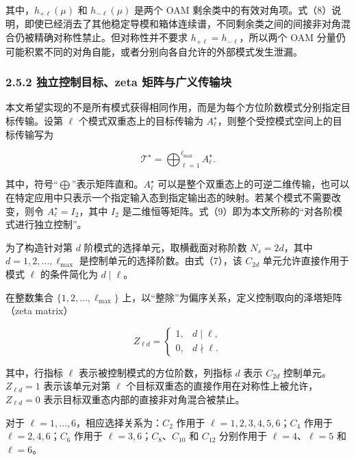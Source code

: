 \documentclass[
  UTF8,
  zihao=-4,
  fontset=fandol]{ctexart}
\begin{document}
其中，\(h_{+\ell}(\mu)\) 和 \(h_{-\ell}(\mu)\) 是两个 OAM
剩余类中的有效对角项。式（8）说明，即使已经消去了其他稳定导模和箱体连续谱，不同剩余类之间的间接非对角混合仍被精确对称性禁止。但对称性并不要求
\(h_{+\ell}=h_{-\ell}\)，所以两个 OAM
分量仍可能积累不同的对角自能，或者分别向各自允许的外部模式发生泄漏。

\hypertarget{ux72ecux7acbux63a7ux5236ux76eeux6807zeta-ux77e9ux9635ux4e0eux5e7fux4e49ux4f20ux8f93ux5757}{%
\subsubsection{2.5.2 独立控制目标、zeta
矩阵与广义传输块}\label{ux72ecux7acbux63a7ux5236ux76eeux6807zeta-ux77e9ux9635ux4e0eux5e7fux4e49ux4f20ux8f93ux5757}}

本文希望实现的不是所有模式获得相同作用，而是为每个方位阶数模式分别指定目标传输。设第
\(\ell\) 个模式双重态上的目标传输为
\(A_\ell^\star\)，则整个受控模式空间上的目标传输写为

\[
\mathcal T^\star
=
\bigoplus_{\ell=1}^{\ell_{\max}}
A_\ell^\star.
\tag{9}
\]

其中，符号``\(\bigoplus\)''表示矩阵直和。\(A_\ell^\star\)
可以是整个双重态上的可逆二维传输，也可以在特定应用中只表示一个指定输入态到指定输出态的映射。若某个模式不需要改变，则令
\(A_\ell^\star=I_2\)，其中 \(I_2\)
是二维恒等矩阵。式（9）即为本文所称的``对各阶模式进行独立控制''。

为了构造针对第 \(d\) 阶模式的选择单元，取横截面对称阶数 \(N_s=2d\)，其中
\(d=1,2,\ldots,\ell_{\max}\) 是控制单元的选择阶数。由式（7），该
\(C_{2d}\) 单元允许直接作用于模式 \(\ell\) 的条件简化为 \(d\mid\ell\)。

在整数集合 \(\{1,2,\ldots,\ell_{\max}\}\)
上，以``整除''为偏序关系，定义控制取向的泽塔矩阵（zeta matrix）

\[
Z_{\ell d}
=
\begin{cases}
1,&d\mid\ell,\\
0,&d\nmid\ell.
\end{cases}
\tag{10}
\]

其中，行指标 \(\ell\) 表示被控制模式的方位阶数，列指标 \(d\) 表示
\(C_{2d}\) 控制单元。\(Z_{\ell d}=1\) 表示该单元对第 \(\ell\)
个目标双重态的直接作用在对称性上被允许，\(Z_{\ell d}=0\)
表示目标双重态内部的直接非对角混合被禁止。

对于 \(\ell=1,\ldots,6\)，相应选择关系为：\(C_2\) 作用于
\(\ell=1,2,3,4,5,6\)；\(C_4\) 作用于 \(\ell=2,4,6\)；\(C_6\) 作用于
\(\ell=3,6\)；\(C_8\)、\(C_{10}\) 和 \(C_{12}\) 分别作用于
\(\ell=4\)、\(\ell=5\) 和 \(\ell=6\)。
\end{document}
